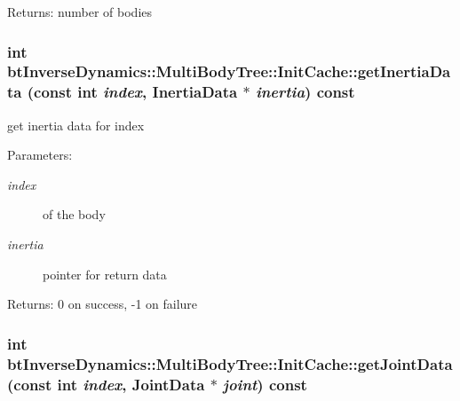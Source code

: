 \begin{Desc}
\item[Returns:]number of bodies \end{Desc}
\hypertarget{classbt_inverse_dynamics_1_1_multi_body_tree_1_1_init_cache_ee00442cb04aaf00db41cac11b046567}{
\subsubsection[getInertiaData]{\setlength{\rightskip}{0pt plus 5cm}int btInverseDynamics::MultiBodyTree::InitCache::getInertiaData (const int {\em index}, \/  {\bf InertiaData} $\ast$ {\em inertia}) const}}
\label{classbt_inverse_dynamics_1_1_multi_body_tree_1_1_init_cache_ee00442cb04aaf00db41cac11b046567}


get inertia data for index \begin{Desc}
\item[Parameters:]
\begin{description}
\item[{\em index}]of the body \item[{\em inertia}]pointer for return data \end{description}
\end{Desc}
\begin{Desc}
\item[Returns:]0 on success, -1 on failure \end{Desc}
\hypertarget{classbt_inverse_dynamics_1_1_multi_body_tree_1_1_init_cache_b877d886f33dd223c33d6629d7531b2d}{
\subsubsection[getJointData]{\setlength{\rightskip}{0pt plus 5cm}int btInverseDynamics::MultiBodyTree::InitCache::getJointData (const int {\em index}, \/  {\bf JointData} $\ast$ {\em joint}) const}}
\label{classbt_inverse_dynamics_1_1_multi_body_tree_1_1_init_cache_b877d886f33dd223c33d6629d7531b2d}


